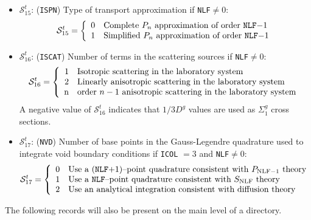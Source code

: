 \begin{itemize}
\item $\mathcal{S}^{t}_{15}$: ({\tt ISPN}) Type of transport approximation if {\tt NLF}$\ne 0$:
\begin{displaymath}
\mathcal{S}^{t}_{15} = \left\{
\begin{array}{rl}
 0 & \textrm{Complete $P_n$ approximation of order {\tt NLF}$-1$} \\
 1 & \textrm{Simplified $P_n$ approximation of order {\tt NLF}$-1$}
\end{array} \right.
\end{displaymath}

\item $\mathcal{S}^{t}_{16}$: ({\tt ISCAT}) Number of terms in the scattering sources if {\tt NLF}$\ne 0$:
\begin{displaymath}
\mathcal{S}^{t}_{16} = \left\{
\begin{array}{rl}
 1 & \textrm{Isotropic scattering in the laboratory system} \\
 2 & \textrm{Linearly anisotropic scattering in the laboratory system} \\
 $n$ & \textrm{order $n-1$ anisotropic scattering in the laboratory system}
\end{array} \right.
\end{displaymath}
\noindent A negative value of $\mathcal{S}^{t}_{16}$ indicates that $1/3D^{g}$ values are used as $\Sigma_1^{g}$ cross sections.

\item $\mathcal{S}^{t}_{17}$: ({\tt NVD}) Number of base points in the Gauss-Legendre quadrature used to integrate
void boundary conditions if {\tt ICOL} $=3$ and {\tt NLF}$\ne 0$:
\begin{displaymath}
\mathcal{S}^{t}_{17} = \left\{
\begin{array}{rl}
 0 & \textrm{Use a ({\tt NLF}$+1$)--point quadrature consistent with $P_{{\rm NLF}-1}$ theory} \\
 1 & \textrm{Use a {\tt NLF}--point quadrature consistent with $S_{\rm NLF}$ theory} \\
 2 & \textrm{Use an analytical integration consistent with diffusion theory}
\end{array} \right.
\end{displaymath}

\end{itemize}

\goodbreak

The following records will also be present on the main level of a 
directory.

